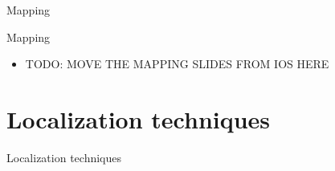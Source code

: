 \documentclass[11pt]{beamer}
\begin{document}
\begin{frame}{}

  \begin{center}

    {\Huge Mapping}

  \end{center}

\end{frame}


\begin{frame}{Mapping}

  \begin{itemize}

    \item TODO: MOVE THE MAPPING SLIDES FROM IOS HERE

  \end{itemize}

\end{frame}


\section{Localization techniques}

\begin{frame}{}

  \begin{center}

    {\Huge Localization techniques}

  \end{center}

\end{frame}
\end{document}
